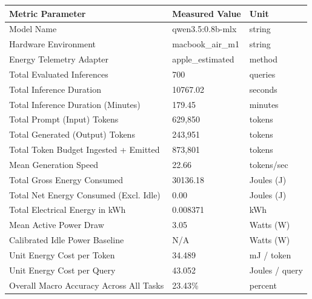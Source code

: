 \begin{tabular}{lll}
\toprule
Metric Parameter & Measured Value & Unit \\
\midrule
Model Name & qwen3.5:0.8b-mlx & string \\
Hardware Environment & macbook\_air\_m1 & string \\
Energy Telemetry Adapter & apple\_estimated & method \\
Total Evaluated Inferences & 700 & queries \\
Total Inference Duration & 10767.02 & seconds \\
Total Inference Duration (Minutes) & 179.45 & minutes \\
Total Prompt (Input) Tokens & 629,850 & tokens \\
Total Generated (Output) Tokens & 243,951 & tokens \\
Total Token Budget Ingested + Emitted & 873,801 & tokens \\
Mean Generation Speed & 22.66 & tokens/sec \\
Total Gross Energy Consumed & 30136.18 & Joules (J) \\
Total Net Energy Consumed (Excl. Idle) & 0.00 & Joules (J) \\
Total Electrical Energy in kWh & 0.008371 & kWh \\
Mean Active Power Draw & 3.05 & Watts (W) \\
Calibrated Idle Power Baseline & N/A & Watts (W) \\
Unit Energy Cost per Token & 34.489 & mJ / token \\
Unit Energy Cost per Query & 43.052 & Joules / query \\
Overall Macro Accuracy Across All Tasks & 23.43\% & percent \\
\bottomrule
\end{tabular}


